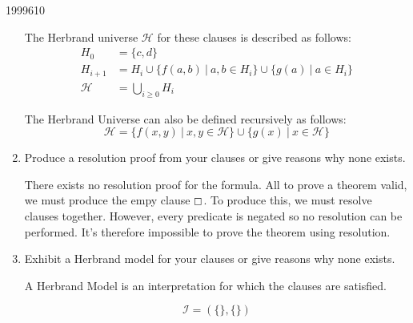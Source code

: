 \documentclass[10pt,\jkfside,a4paper]{article}
\begin{document}
\begin{examquestion}{1999}{6}{10}
\begin{enumerate}
The Herbrand universe $\mathcal{H}$ for these clauses is described
as follows:
\begin{align*}
H_0 &= \{c, d\} \\
H_{i+1} &= H_i \cup \{f(a, b) \ | \ a, b \in H_i\} \cup \{g(a)\ | \ a \in
H_i\} \\
\mathcal{H} &= \bigcup_{i \geq 0} H_i
\end{align*}

The Herbrand Universe can also be defined recursively as follows:
\[
\mathcal{H} = \{f(x, y) \ | \ x, y \in \mathcal{H}\} \cup \{g(x) \ | \ x \in
\mathcal{H}\}
\]

\item Produce a resolution proof from your clauses or give reasons why none
exists.

There exists no resolution proof for the formula. All to prove a theorem
valid, we must produce the empy clause $\boxempty$. To produce this, we must
resolve clauses together. However, every predicate is negated so no
resolution can be performed. It's therefore impossible to prove the theorem
using resolution.

\item Exhibit a Herbrand model for your clauses or give reasons why none
exists.

A Herbrand Model is an interpretation for which the clauses are satisfied.

\[
\mathcal{I}
=
(
\{
\},
\{

\}
)
\]

\end{enumerate}

\end{examquestion}
\end{document}
